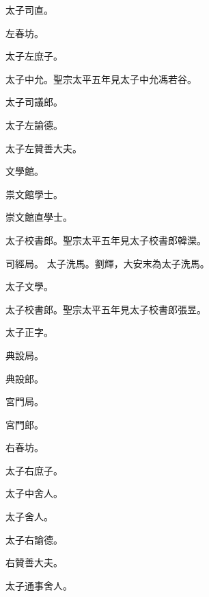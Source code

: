 \begin{pinyinscope}
 太子司直。



 左春坊。



 太子左庶子。



 太子中允。聖宗太平五年見太子中允馮若谷。



 太子司議郎。



 太子左諭德。



 太子左贊善大夫。



 文學館。



 祟文館學士。



 崇文館直學士。



 太子校書郎。聖宗太平五年見太子校書郎韓灤。



 司經局。
 太子洗馬。劉輝，大安末為太子洗馬。



 太子文學。



 太子校書郎。聖宗太平五年見太子校書郎張昱。



 太子正字。



 典設局。



 典設郎。



 宮門局。



 宮門郎。



 右春坊。



 太子右庶子。



 太子中舍人。



 太子舍人。



 太子右諭德。



 右贊善大夫。



 太子通事舍人。




\end{pinyinscope}
